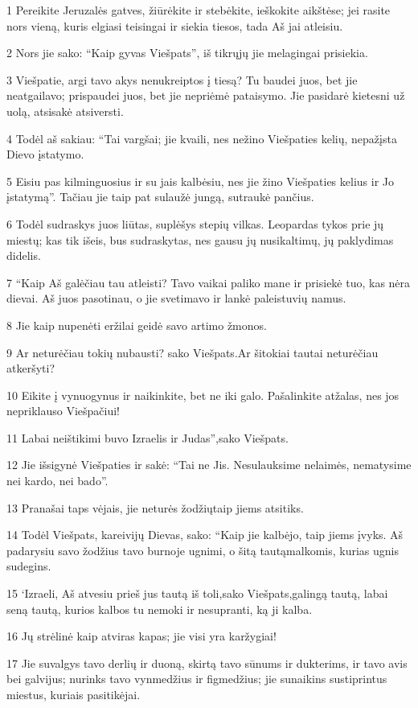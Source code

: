 \par 1 Pereikite Jeruzalės gatves, žiūrėkite ir stebėkite, ieškokite aikštėse; jei rasite nors vieną, kuris elgiasi teisingai ir siekia tiesos, tada Aš jai atleisiu. 
\par 2 Nors jie sako: “Kaip gyvas Viešpats”, iš tikrųjų jie melagingai prisiekia. 
\par 3 Viešpatie, argi tavo akys nenukreiptos į tiesą? Tu baudei juos, bet jie neatgailavo; prispaudei juos, bet jie nepriėmė pataisymo. Jie pasidarė kietesni už uolą, atsisakė atsiversti. 
\par 4 Todėl aš sakiau: “Tai vargšai; jie kvaili, nes nežino Viešpaties kelių, nepažįsta Dievo įstatymo. 
\par 5 Eisiu pas kilminguosius ir su jais kalbėsiu, nes jie žino Viešpaties kelius ir Jo įstatymą”. Tačiau jie taip pat sulaužė jungą, sutraukė pančius. 
\par 6 Todėl sudraskys juos liūtas, suplėšys stepių vilkas. Leopardas tykos prie jų miestų; kas tik išeis, bus sudraskytas, nes gausu jų nusikaltimų, jų paklydimas didelis. 
\par 7 “Kaip Aš galėčiau tau atleisti? Tavo vaikai paliko mane ir prisiekė tuo, kas nėra dievai. Aš juos pasotinau, o jie svetimavo ir lankė paleistuvių namus. 
\par 8 Jie kaip nupenėti eržilai geidė savo artimo žmonos. 
\par 9 Ar neturėčiau tokių nubausti?­ sako Viešpats.­Ar šitokiai tautai neturėčiau atkeršyti? 
\par 10 Eikite į vynuogynus ir naikinkite, bet ne iki galo. Pašalinkite atžalas, nes jos nepriklauso Viešpačiui! 
\par 11 Labai neištikimi buvo Izraelis ir Judas”,­sako Viešpats. 
\par 12 Jie išsigynė Viešpaties ir sakė: “Tai ne Jis. Nesulauksime nelaimės, nematysime nei kardo, nei bado”. 
\par 13 Pranašai taps vėjais, jie neturės žodžių­taip jiems atsitiks. 
\par 14 Todėl Viešpats, kareivijų Dievas, sako: “Kaip jie kalbėjo, taip jiems įvyks. Aš padarysiu savo žodžius tavo burnoje ugnimi, o šitą tautą­malkomis, kurias ugnis sudegins. 
\par 15 ‘Izraeli, Aš atvesiu prieš jus tautą iš toli,­sako Viešpats,­galingą tautą, labai seną tautą, kurios kalbos tu nemoki ir nesupranti, ką ji kalba. 
\par 16 Jų strėlinė kaip atviras kapas; jie visi yra karžygiai! 
\par 17 Jie suvalgys tavo derlių ir duoną, skirtą tavo sūnums ir dukterims, ir tavo avis bei galvijus; nurinks tavo vynmedžius ir figmedžius; jie sunaikins sustiprintus miestus, kuriais pasitikėjai. 
